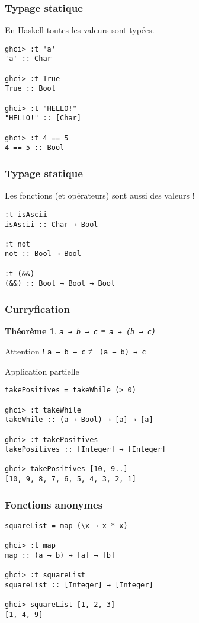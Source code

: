 \documentclass[10pt]{beamer}
\newtheorem{thrm}{Théorème}
\begin{document}
\begin{frame}[fragile]
\frametitle{Typage statique}
En Haskell toutes les valeurs sont typées.
\begin{verbatim}
ghci> :t 'a'
'a' :: Char

ghci> :t True
True :: Bool

ghci> :t "HELLO!"
"HELLO!" :: [Char]

ghci> :t 4 == 5
4 == 5 :: Bool
\end{verbatim}
\end{frame}



\begin{frame}[fragile]
\frametitle{Typage statique}
Les fonctions (et opérateurs) sont aussi des valeurs !
\begin{verbatim}
:t isAscii
isAscii :: Char → Bool

:t not
not :: Bool → Bool

:t (&&)
(&&) :: Bool → Bool → Bool
\end{verbatim}
\end{frame}



\begin{frame}[fragile]
\frametitle{Curryfication}
\begin{thrm}
\verb|a → b → c| ≡ \verb|a → (b → c)|
\end{thrm}

\pause

\begin{block}
{Attention !}
\verb|a → b → c| ≢ \verb|(a → b) → c|
\end{block}

\pause

\begin{block}
{Application partielle}
\begin{verbatim}
takePositives = takeWhile (> 0)

ghci> :t takeWhile
takeWhile :: (a → Bool) → [a] → [a]

ghci> :t takePositives
takePositives :: [Integer] → [Integer]

ghci> takePositives [10, 9..]
[10, 9, 8, 7, 6, 5, 4, 3, 2, 1]
\end{verbatim}
\end{block}
\end{frame}



\begin{frame}[fragile]
\frametitle{Fonctions anonymes}
\begin{verbatim}
squareList = map (\x → x * x)

ghci> :t map
map :: (a → b) → [a] → [b]

ghci> :t squareList
squareList :: [Integer] → [Integer]

ghci> squareList [1, 2, 3]
[1, 4, 9]
\end{verbatim}
\end{frame}
\end{document}
